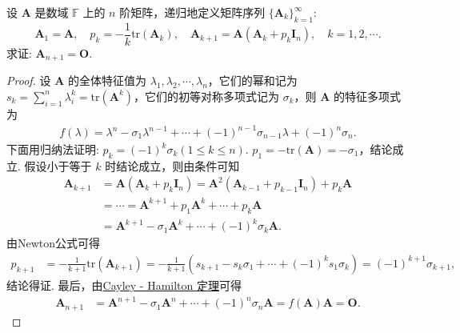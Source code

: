 \documentclass[../../main.tex]{subfiles}%
\begin{document}
\begin{example}
设 $\boldsymbol{A}$ 是数域 $\mathbb{F}$ 上的 $n$ 阶矩阵，递归地定义矩阵序列 $\{\boldsymbol{A}_k\}_{k = 1}^{\infty}$:
\[
\boldsymbol{A}_1=\boldsymbol{A}, \quad
p_k=-\frac{1}{k}\mathrm{tr}(\boldsymbol{A}_k), \quad
\boldsymbol{A}_{k + 1}=\boldsymbol{A}(\boldsymbol{A}_k + p_k\boldsymbol{I}_n), \quad k = 1,2,\cdots.
\]
求证: $\boldsymbol{A}_{n + 1}=\boldsymbol{O}$.
\end{example}
\begin{proof}

设 $\boldsymbol{A}$ 的全体特征值为 $\lambda_1,\lambda_2,\cdots,\lambda_n$，它们的幂和记为 $s_k=\sum_{i = 1}^{n}\lambda_i^k=\mathrm{tr}(\boldsymbol{A}^k)$，它们的初等对称多项式记为 $\sigma_k$，则 $\boldsymbol{A}$ 的特征多项式为
\begin{align*}
f(\lambda)=\lambda^n - \sigma_1\lambda^{n - 1}+\cdots + (-1)^{n - 1}\sigma_{n - 1}\lambda + (-1)^n\sigma_n.
\end{align*}
下面用归纳法证明: $p_k = (-1)^k\sigma_k (1\leqslant  k\leqslant  n)$. $p_1 = -\mathrm{tr}(\boldsymbol{A}) = -\sigma_1$，结论成立. 假设小于等于 $k$ 时结论成立，则由条件可知
\begin{align*}
\boldsymbol{A}_{k+1}&=\boldsymbol{A}\left( \boldsymbol{A}_k+p_k\boldsymbol{I}_n \right) =\boldsymbol{A}^2\left( \boldsymbol{A}_{k-1}+p_{k-1}\boldsymbol{I}_n \right) +p_k\boldsymbol{A}
\\
&=\cdots =\boldsymbol{A}^{k+1}+p_1\boldsymbol{A}^k+\cdots +p_k\boldsymbol{A}
\\
&=\boldsymbol{A}^{k+1}-\sigma _1\boldsymbol{A}^k+\cdots +(-1)^k\sigma _k\boldsymbol{A}.
\end{align*}
由Newton公式可得
\begin{align*}
p_{k + 1}&=-\frac{1}{k + 1}\mathrm{tr}(\boldsymbol{A}_{k + 1})=-\frac{1}{k + 1}(s_{k + 1} - s_k\sigma_1+\cdots + (-1)^k s_1\sigma_k)=(-1)^{k + 1}\sigma_{k + 1},
\end{align*}
结论得证. 最后，由\hyperref[theorem:Cayley-Hamilton定理]{Cayley - Hamilton 定理}可得
\begin{align*}
\boldsymbol{A}_{n + 1}&=\boldsymbol{A}^{n + 1} - \sigma_1\boldsymbol{A}^n+\cdots + (-1)^n\sigma_n\boldsymbol{A}=f(\boldsymbol{A})\boldsymbol{A}=\boldsymbol{O}.
\end{align*} 

\end{proof}
\end{document}
